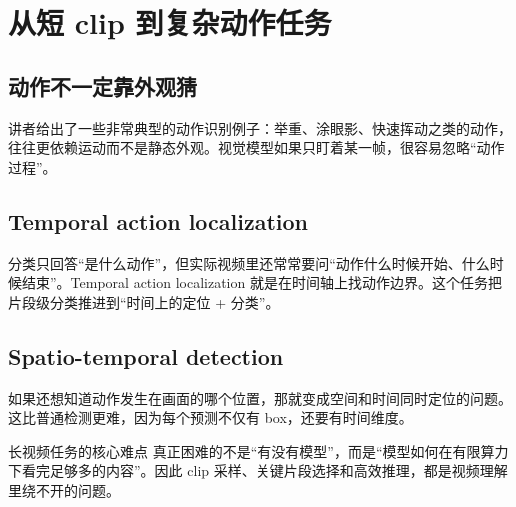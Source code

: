 \section{从短 clip 到复杂动作任务}

\subsection{动作不一定靠外观猜}

讲者给出了一些非常典型的动作识别例子：举重、涂眼影、快速挥动之类的动作，往往更依赖运动而不是静态外观。视觉模型如果只盯着某一帧，很容易忽略“动作过程”。

\subsection{Temporal action localization}

分类只回答“是什么动作”，但实际视频里还常常要问“动作什么时候开始、什么时候结束”。Temporal action localization 就是在时间轴上找动作边界。这个任务把片段级分类推进到“时间上的定位 + 分类”。

\subsection{Spatio-temporal detection}

如果还想知道动作发生在画面的哪个位置，那就变成空间和时间同时定位的问题。这比普通检测更难，因为每个预测不仅有 box，还要有时间维度。

\begin{warningbox}{长视频任务的核心难点}
真正困难的不是“有没有模型”，而是“模型如何在有限算力下看完足够多的内容”。因此 clip 采样、关键片段选择和高效推理，都是视频理解里绕不开的问题。
\end{warningbox}

